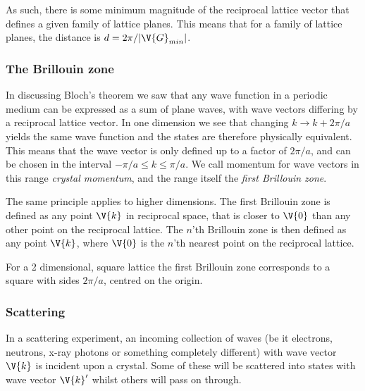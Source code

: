\documentclass[main.tex]{subfiles}
\begin{document}
	As such, there is some minimum magnitude of the reciprocal lattice vector that defines a given family of lattice planes. This means that for a family of lattice planes, the distance is $ d = 2\pi /| \V{G}_{min}| $.
	
	\subsubsection{The Brillouin zone}
	In discussing Bloch's theorem we saw that any wave function in a periodic medium can be expressed as a sum of plane waves, with wave vectors differing by a reciprocal lattice vector. In one dimension we see that changing $ k \to k + 2\pi/a $ yields the same wave function and the states are therefore physically equivalent. This means that the wave vector is only defined up to a factor of $ 2 \pi / a $, and can be chosen in the interval $ -\pi /a \leq k \leq \pi/a $. We call momentum for wave vectors in this range \textit{crystal momentum}, and the range itself the \textit{first Brillouin zone}.
	
	The same principle applies to higher dimensions. The first Brillouin zone is defined as any point $ \V{k} $ in reciprocal space, that is closer to $ \V{0} $ than any other point on the reciprocal lattice. The $ n $'th Brillouin zone is then defined as any point $ \V{k} $, where $ \V{0} $ is the $ n $'th nearest point on the reciprocal lattice.
	
	For a 2 dimensional, square lattice the first Brillouin zone corresponds to a square with sides $ 2\pi /a $, centred on the origin.
	
	\subsubsection{Scattering}
	In a scattering experiment, an incoming collection of waves (be it electrons, neutrons, x-ray photons or something completely different) with wave vector $ \V{k} $ is incident upon a crystal. Some of these will be scattered into states with wave vector $ \V{k}' $ whilst others will pass on through. 
	
\end{document}
